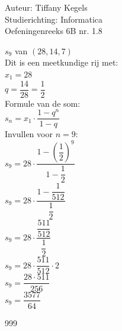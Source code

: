 \documentclass[a4paper]{article}
\begin{document}
  
\noindent \large Auteur: Tiffany Kegels \\
\noindent \large Studierichting: Informatica\\
\noindent \large Oefeningenreeks 6B nr. 1.8\\

\medskip

\normalsize

$s_9$ van $(28,14,7)$\\

Dit is een meetkundige rij met:\\

$x_1=28$\\

$q=\dfrac{14}{28}=\dfrac12$\\

Formule van de som:\\

$s_n=x_1\cdot\dfrac{1-q^n}{1-q}$\\

Invullen voor $n=9$:\\

$s_9=28\cdot\dfrac{1-\left(\dfrac12\right)^9}{1-\dfrac12}$\\

$s_9=28\cdot\dfrac{1-\dfrac1{512}}{\dfrac12}$\\

$s_9=28\cdot\dfrac{\dfrac{511}{512}}{\dfrac12}$\\

$s_9=28\cdot\dfrac{511}{512}\cdot2$\\

$s_9=\dfrac{28\cdot511}{256}$\\

$s_9=\dfrac{3577}{64}$


\begin{thebibliography}{999}

\end{thebibliography}
\end{document}
